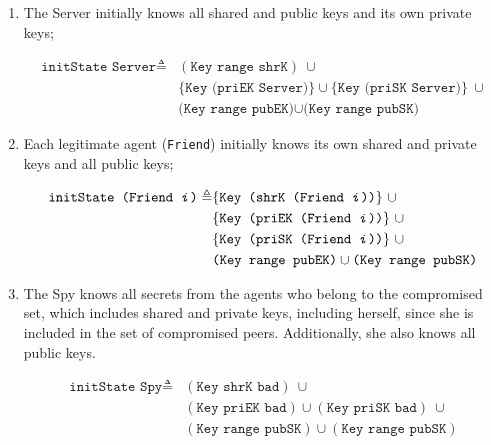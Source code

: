 \begin{enumerate}
  \item The Server initially knows all shared and public keys and its own private keys;

  \begin{equation*}
    \begin{split}
      \texttt{initState Server} \triangleq
      & (\texttt{Key range shrK}) \  \cup \\
      & \{\texttt{Key (priEK Server)}\} \cup \{\texttt{Key (priSK Server)}\}\  \cup \\
      & \texttt{(Key range pubEK)} \cup \texttt{(Key range pubSK)}
    \end{split}
  \end{equation*}


  \item Each legitimate agent (\texttt{Friend}) initially knows its own shared and private keys and all public keys;

  \begin{equation*}
    \begin{split}
      \texttt{initState (Friend \textit{i})} \triangleq
      & \{ \texttt{Key (shrK (Friend \textit{i}))} \} \ \cup \\
      & \{ \texttt{Key (priEK (Friend \textit{i}))} \} \ \cup \\
      & \{ \texttt{Key (priSK (Friend \textit{i}))} \} \ \cup \\
      & \texttt{(Key range pubEK)} \cup \texttt{(Key range pubSK)}
    \end{split}
  \end{equation*}

  \item The Spy knows all secrets from the agents who belong to the compromised set, which includes shared and private keys, including herself, since she is included in the set of compromised peers. Additionally, she also knows all public keys.

  \begin{equation*}
    \begin{split}
      \texttt{initState Spy} \triangleq
      & (\texttt{Key shrK bad}) \ \cup \\
      & (\texttt{Key priEK bad}) \cup (\texttt{Key priSK bad}) \ \cup \\
      & (\texttt{Key range pubSK}) \cup (\texttt{Key range pubSK})
    \end{split}
  \end{equation*}

\end{enumerate}

